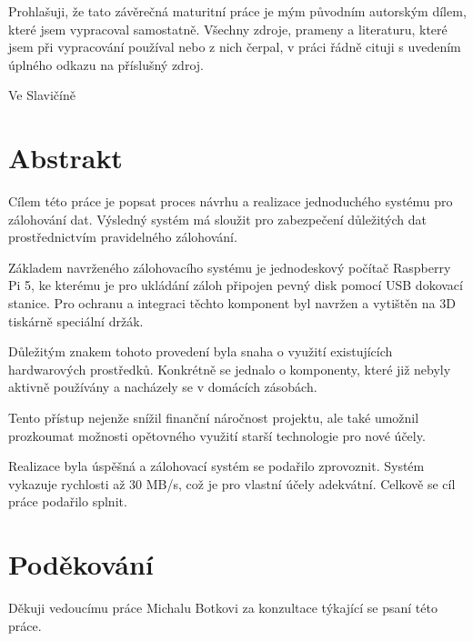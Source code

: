 \documentclass[a4paper,12pt, oneside]{book}
\makeatletter
\let\newauthor\@author
\let\newdate\@date
\makeatother
\begin{document}
\newpage


\noindent

Prohlašuji, že tato závěrečná maturitní práce je mým původním autorským dílem,
které jsem vypracoval samostatně. Všechny zdroje, prameny a literaturu, které
jsem při vypracování používal nebo z nich čerpal, v práci řádně cituji
s uvedením úplného odkazu na příslušný zdroj.

\begin{center}
Ve Slavičíně

\newdate

\vspace{10mm}

\newauthor
\end{center}

\newpage
\section*{Abstrakt}

Cílem této práce je popsat proces návrhu a realizace jednoduchého
systému pro zálohování dat. Výsledný systém má sloužit pro zabezpečení důležitých
dat prostřednictvím pravidelného zálohování.

Základem navrženého zálohovacího systému je jednodeskový počítač Raspberry Pi 5,
ke kterému je pro ukládání záloh připojen pevný disk pomocí USB
dokovací stanice. Pro ochranu a integraci těchto komponent byl navržen a
vytištěn na 3D tiskárně speciální držák. 

Důležitým znakem tohoto provedení byla snaha o využití existujících
hardwarových prostředků. Konkrétně se jednalo o komponenty, které již nebyly
aktivně používány a nacházely se v domácích zásobách.

Tento přístup nejenže snížil finanční náročnost projektu, ale také umožnil
prozkoumat možnosti opětovného využití starší technologie pro nové účely.

Realizace byla úspěšná a zálohovací systém se podařilo zprovoznit. Systém
vykazuje rychlosti až 30 MB/s, což je pro vlastní účely adekvátní. Celkově 
se cíl práce podařilo splnit.

\newpage
\section*{Poděkování}

Děkuji vedoucímu práce Michalu Botkovi za konzultace týkající 
se psaní této práce. 
\end{document}
